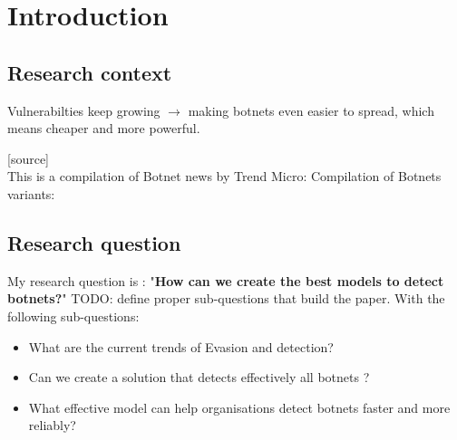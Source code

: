 
\chapter{Introduction} %

\label{Introduction} %


\newcommand{\keyword}[1]{\textbf{#1}}
\newcommand{\tabhead}[1]{\textbf{#1}}
\newcommand{\code}[1]{\texttt{#1}}
\newcommand{\file}[1]{\texttt{\bfseries#1}}
\newcommand{\option}[1]{\texttt{\itshape#1}}

\section{Research context}
Vulnerabilties keep growing $\rightarrow$ making botnets even easier to spread, which means cheaper and more powerful.

[source]\\
This is a compilation of Botnet news by Trend Micro: %
Compilation of Botnets variants: %
\section{Research question}
My research question is : "\textbf{How can we create the best models to detect botnets?}"
TODO: define proper sub-questions that build the paper.
With the following sub-questions:
\begin{itemize}
\item What are the current trends of Evasion and detection?
\item Can we create a solution that detects effectively all botnets ?
\item What effective model can help organisations detect botnets faster and more reliably?
\end{itemize}
